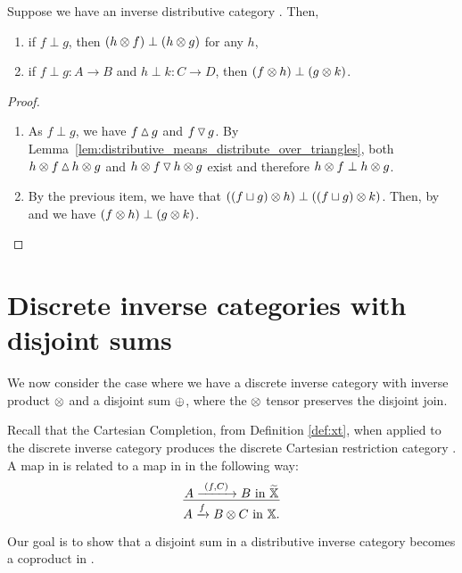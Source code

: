 \begin{corollary}\label{cor:inverse_product_and_disjointness}
  Suppose we have an inverse distributive category \X. Then,
  \begin{enumerate}[{(}i{)}]
    \item if $f \perp g$, then $(h\otimes f) \perp (h\otimes  g)$ for any $h$,
    \item  if  $f\perp g : A\to B$ and $h \perp k: C\to D$, then $(f\otimes h)\perp (g\otimes k)$.
   \end{enumerate}
\end{corollary}
\begin{proof}
  \prepprooflist
  \begin{enumerate}[{(}i{)}]
    \item As $f\perp g$, we have $f\operatorname{\vartriangle} g$ and $f\operatorname{\triangledown} g$. By
      Lemma~\ref{lem:distributive_means_distribute_over_triangles}, both $h\otimes f \operatorname{\vartriangle} h\otimes g$ and
      $h\otimes f \operatorname{\triangledown} h\otimes g$ exist and therefore $h\otimes f \perp h\otimes g$.
    \item By the previous item, we have that $((f\sqcup g)\otimes h) \perp ((f\sqcup g)\otimes k)$. Then, by
       and  we have $(f\otimes h)\perp (g\otimes k)$.
  \end{enumerate}
\end{proof}

\section{Discrete inverse categories with disjoint sums} %
\label{sec:discrete_inverse_categories_with_disjoint_sums}

We now consider the case where we have a discrete inverse category with inverse product
 $\otimes$ and a disjoint sum $\oplus$, where the $\otimes$ tensor preserves the disjoint join.

Recall that the Cartesian Completion, from Definition \ref{def:xt}, when applied to the discrete
inverse category \X produces the discrete Cartesian restriction category \Xt. A map in \Xt is
related to a map in \X in the following way:
\[
  \infer{A\xrightarrow{f} B\*C \text{ in }\X.}{A \xrightarrow{\ (f,C)\ } B \text{ in } \Xt}
\]

Our goal is to show that a disjoint sum in a distributive inverse category becomes a coproduct
in \Xt.

